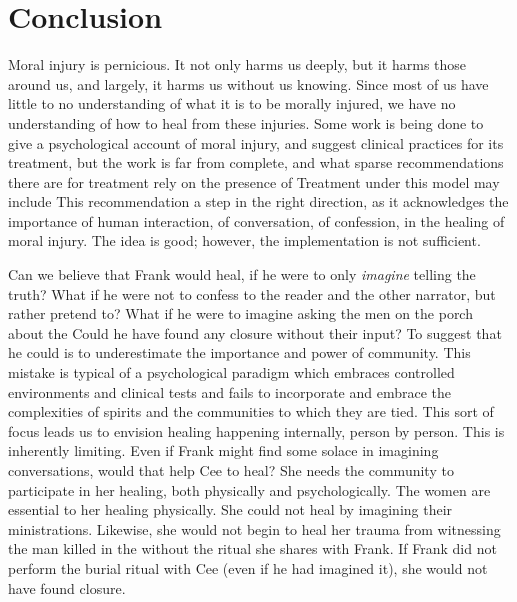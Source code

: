 \documentclass[12pt]{article}
\begin{document}

\section{Conclusion}

Moral injury is pernicious. It not only harms us deeply, but it harms those
around us, and largely, it harms us without us knowing. Since most of us have
little to no understanding of what it is to be morally injured, we have no
understanding of how to heal from these injuries. Some work is being done to
give a psychological account of moral injury, and suggest clinical practices
for its treatment,\autocite{Litz09} but the work is far from complete, and what
sparse recommendations there are for treatment rely on the presence of
\autocite[\S 7.2]{Litz09} Treatment under this
model may include \autocite[\S 7.2.5]{Litz09} This recommendation a step in the
right direction, as it acknowledges the importance of human interaction, of
conversation, of confession, in the healing of moral injury. The idea is good;
however, the implementation is not sufficient.

Can we believe that Frank would heal, if he were to only \emph{imagine} telling
the truth? What if he were not to confess to the reader and the other narrator,
but rather pretend to? What if he were to imagine asking the men on the porch
about the  Could he have found any closure without their input?
To suggest that he could is to underestimate the importance and power of
community.  This mistake is typical of a psychological paradigm which embraces
controlled environments and clinical tests and fails to incorporate and
embrace the complexities of spirits and the communities to which they are tied.
This sort of focus leads us to envision healing happening internally, person by
person.  
This is inherently limiting. Even if Frank might find some solace in imagining
conversations, would that help Cee to heal? She needs the community to
participate in her healing, both physically and psychologically. The women are
essential to her healing physically. She could not heal by imagining their
ministrations. Likewise, she would not begin to heal her trauma from witnessing
the man killed in the
\autocite[137]{Morrison12} without the ritual
she shares with Frank. If Frank did not perform the burial ritual with Cee
(even if he had imagined it), she would not have found closure.
\end{document}

